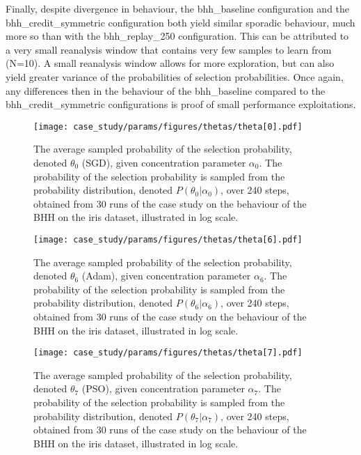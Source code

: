 Finally, despite divergence in behaviour, the bhh\_baseline configuration and the bhh\_credit\_symmetric configuration both yield similar sporadic behaviour, much more so than with the bhh\_replay\_250 configuration. This can be attributed to a very small reanalysis window that contains very few samples to learn from (N=10). A small reanalysis window allows for more exploration, but can also yield greater variance of the probabilities of selection probabilities. Once again, any differences then in the behaviour of the  bhh\_baseline compared to the bhh\_credit\_symmetric configurations is proof of small performance exploitations.

\begin{figure}[htpb]
	\centering
	\texttt{[image: case\_study/params/figures/thetas/theta[0].pdf]}
	\caption{The average sampled probability of the selection probability, denoted $\theta_{0}$ (\acs{SGD}), given concentration parameter $\alpha_{0}$. The probability of the selection probability is sampled from the probability distribution, denoted $P(\theta_{0} \vert \alpha_{0})$, over 240 steps, obtained from 30 runs of the case study on the behaviour of the \acs{BHH} on the iris dataset, illustrated in log scale.}
	\label{fig:results:case_study:theta:0}
\end{figure}

\begin{figure}[htpb]
	\centering
	\texttt{[image: case\_study/params/figures/thetas/theta[6].pdf]}
	\caption{The average sampled probability of the selection probability, denoted $\theta_{6}$ (\acs{Adam}), given concentration parameter $\alpha_{6}$. The probability of the selection probability is sampled from the probability distribution, denoted $P(\theta_{6} \vert \alpha_{6})$, over 240 steps, obtained from 30 runs of the case study on the behaviour of the \acs{BHH} on the iris dataset, illustrated in log scale.}
	\label{fig:results:case_study:theta:6}
\end{figure}

\begin{figure}[htpb]
	\centering
	\texttt{[image: case\_study/params/figures/thetas/theta[7].pdf]}
	\caption{The average sampled probability of the selection probability, denoted $\theta_{7}$ (\acs{PSO}), given concentration parameter $\alpha_{7}$. The probability of the selection probability is sampled from the probability distribution, denoted $P(\theta_{7} \vert \alpha_{7})$, over 240 steps, obtained from 30 runs of the case study on the behaviour of the \acs{BHH} on the iris dataset, illustrated in log scale.}
	\label{fig:results:case_study:theta:7}
\end{figure}

